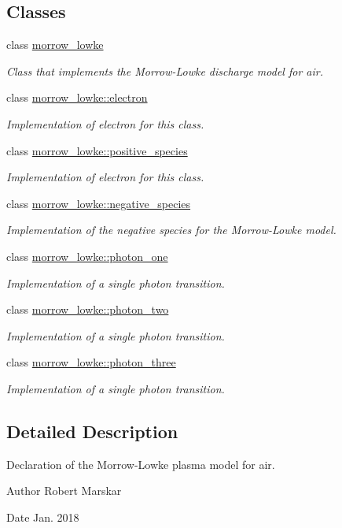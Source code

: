 \subsection*{Classes}
\begin{DoxyCompactItemize}
\item 
class \hyperlink{classmorrow__lowke}{morrow\+\_\+lowke}
\begin{DoxyCompactList}\small\item\em Class that implements the Morrow-\/\+Lowke discharge model for air. \end{DoxyCompactList}\item 
class \hyperlink{classmorrow__lowke_1_1electron}{morrow\+\_\+lowke\+::electron}
\begin{DoxyCompactList}\small\item\em Implementation of electron for this class. \end{DoxyCompactList}\item 
class \hyperlink{classmorrow__lowke_1_1positive__species}{morrow\+\_\+lowke\+::positive\+\_\+species}
\begin{DoxyCompactList}\small\item\em Implementation of electron for this class. \end{DoxyCompactList}\item 
class \hyperlink{classmorrow__lowke_1_1negative__species}{morrow\+\_\+lowke\+::negative\+\_\+species}
\begin{DoxyCompactList}\small\item\em Implementation of the negative species for the Morrow-\/\+Lowke model. \end{DoxyCompactList}\item 
class \hyperlink{classmorrow__lowke_1_1photon__one}{morrow\+\_\+lowke\+::photon\+\_\+one}
\begin{DoxyCompactList}\small\item\em Implementation of a single photon transition. \end{DoxyCompactList}\item 
class \hyperlink{classmorrow__lowke_1_1photon__two}{morrow\+\_\+lowke\+::photon\+\_\+two}
\begin{DoxyCompactList}\small\item\em Implementation of a single photon transition. \end{DoxyCompactList}\item 
class \hyperlink{classmorrow__lowke_1_1photon__three}{morrow\+\_\+lowke\+::photon\+\_\+three}
\begin{DoxyCompactList}\small\item\em Implementation of a single photon transition. \end{DoxyCompactList}\end{DoxyCompactItemize}


\subsection{Detailed Description}
Declaration of the Morrow-\/\+Lowke plasma model for air. 

\begin{DoxyAuthor}{Author}
Robert Marskar 
\end{DoxyAuthor}
\begin{DoxyDate}{Date}
Jan. 2018 
\end{DoxyDate}
